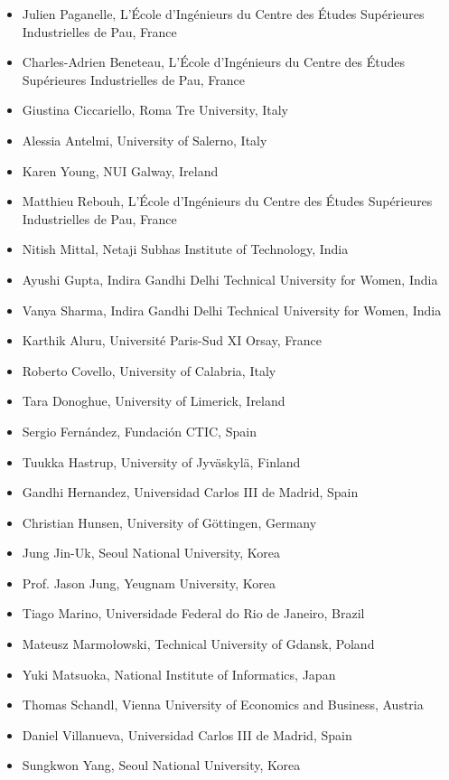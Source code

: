 \documentclass[10pt,a4paper]{res} %
\begin{document}
\begin{resume}
\begin{itemize} \itemsep -2pt
\item Julien Paganelle, L'\'{E}cole d'Ing\'{e}nieurs du Centre des \'{E}tudes Sup\'{e}rieures Industrielles de Pau, France
\item Charles-Adrien Beneteau, L'\'{E}cole d'Ing\'{e}nieurs du Centre des \'{E}tudes Sup\'{e}rieures Industrielles de Pau, France
\item Giustina Ciccariello, Roma Tre University, Italy
\item Alessia Antelmi, University of Salerno, Italy
\item Karen Young, NUI Galway, Ireland
\item Matthieu Rebouh, L'\'{E}cole d'Ing\'{e}nieurs du Centre des \'{E}tudes Sup\'{e}rieures Industrielles de Pau, France
\item Nitish Mittal, Netaji Subhas Institute of Technology, India
\item Ayushi Gupta, Indira Gandhi Delhi Technical University for Women, India
\item Vanya Sharma, Indira Gandhi Delhi Technical University for Women, India
\item Karthik Aluru, Universit\'{e} Paris-Sud XI Orsay, France
\item Roberto Covello, University of Calabria, Italy
\item Tara Donoghue, University of Limerick, Ireland
\item Sergio Fern\'{a}ndez, Fundaci\'{o}n CTIC, Spain
\item Tuukka Hastrup, University of Jyv\"{a}skyl\"{a}, Finland
\item Gandhi Hernandez, Universidad Carlos III de Madrid, Spain
\item Christian Hunsen, University of G\"{o}ttingen, Germany
\item Jung Jin-Uk, Seoul National University, Korea
\item Prof. Jason Jung, Yeugnam University, Korea
\item Tiago Marino, Universidade Federal do Rio de Janeiro, Brazil
\item Mateusz Marmo{\l}owski, Technical University of Gdansk, Poland
\item Yuki Matsuoka, National Institute of Informatics, Japan
\item Thomas Schandl, Vienna University of Economics and Business, Austria
\item Daniel Villanueva, Universidad Carlos III de Madrid, Spain
\item Sungkwon Yang, Seoul National University, Korea
\end{itemize}


\end{resume}
\end{document}
